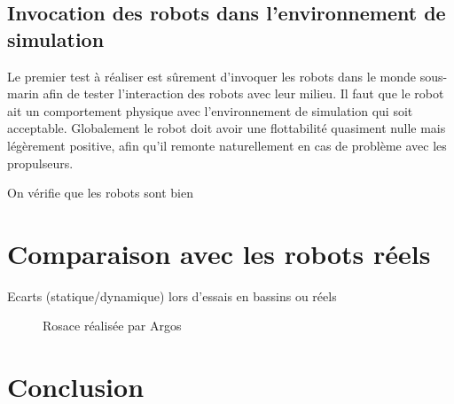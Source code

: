 		\subsection{Invocation des robots dans l'environnement de simulation}

			Le premier test à réaliser est sûrement d'invoquer les robots dans le monde sous-marin afin de tester l'interaction des robots avec leur milieu. Il faut que le robot ait un comportement physique avec l'environnement de simulation qui soit acceptable. Globalement le robot doit avoir une flottabilité quasiment nulle mais légèrement positive, afin qu'il remonte naturellement en cas de problème avec les propulseurs.

			On vérifie que les robots sont bien 

	\section{Comparaison avec les robots réels}

		Ecarts (statique/dynamique) lors d'essais en bassins ou réels

		\begin{figure}
			
			\caption{Rosace réalisée par Argos}
			\label{fig:rosace_argos}
		\end{figure}

	\section{Conclusion}